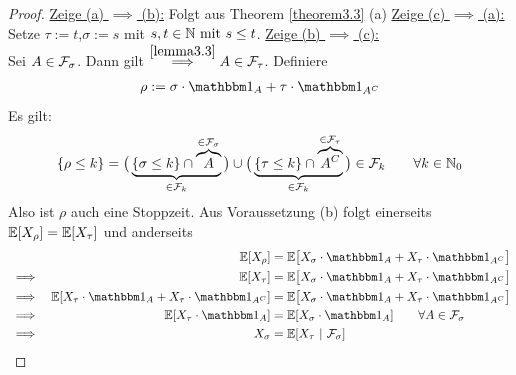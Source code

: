 \begin{proof}
\underline{Zeige (a) $\implies$ (b):} 
Folgt aus Theorem \ref{theorem3.3} (a)\nl
\underline{Zeige (c) $\implies$ (a):}\\
Setze $\tau:=t$,$\sigma:=s$ mit $s,t\in\mathbb{N}\text{ mit } s\leq t$.\nl
\underline{Zeige (b) $\implies$ (c):}\\
Sei $A\in\mathcal{F}_\sigma$. Dann gilt $\stackrel{\ref{lemma3.3}}{\implies} A\in\mathcal{F}_\tau$. Definiere
\begin{align*}
\rho:=\sigma\cdot\indi_A+\tau\cdot\indi_{A^C}
\end{align*}
Es gilt:
\begin{align*}
\lbrace\rho\leq k\rbrace=\big(\underbrace{\lbrace\sigma\leq k\rbrace\cap \overbrace{A}^{\in\mathcal{F}_\sigma}}_{\in\mathcal{F}_k}\big)\cup\big(\underbrace{\lbrace\tau\leq k\rbrace\cap \overbrace{A^C}^{\in\mathcal{F}_\tau}}_{\in\mathcal{F}_k}\big)\in\mathcal{F}_k\qquad\forall k\in\mathbb{N}_0
\end{align*}
Also ist $\rho$ auch eine Stoppzeit. Aus Voraussetzung (b) folgt einerseits $\mathbb{E}[X_\rho]=\mathbb{E}[X_\tau]$ und anderseits
\begin{align*}
	&&\E[X_\rho]
&=\E\big[X_\sigma\cdot\indi_A+X_\tau\cdot\indi_{A^C}\big]\\
&\implies&
\E[X_\tau]
&=\E\big[X_\sigma\cdot\indi_A+X_\tau\cdot\indi_{A^C}\big]\\
&\implies&
\E[X_\tau\cdot \indi_A + X_\tau\cdot \indi_{A^C}]
&=\E\big[X_\sigma\cdot\indi_A+X_\tau\cdot\indi_{A^C}\big]\\
&\implies&
\E[X_\tau\cdot\indi_A]
&=\E[X_\sigma\cdot\indi_A]\qquad\forall A\in\F_\sigma\\
&\implies&
X_\sigma&=\E[X_\tau~|~\F_\sigma]
\end{align*}
\end{proof}



